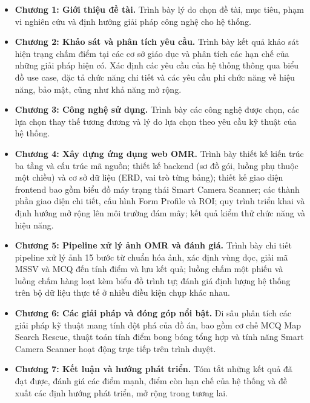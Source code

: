 \begin{itemize}
    \item \textbf{Chương 1: Giới thiệu đề tài.} Trình bày lý do chọn đề tài, mục tiêu, phạm vi nghiên cứu và định hướng giải pháp công nghệ cho hệ thống.

    \item \textbf{Chương 2: Khảo sát và phân tích yêu cầu.} Trình bày kết quả khảo sát hiện trạng chấm điểm tại các cơ sở giáo dục và phân tích các hạn chế của những giải pháp hiện có. Xác định các yêu cầu của hệ thống thông qua biểu đồ use case, đặc tả chức năng chi tiết và các yêu cầu phi chức năng về hiệu năng, bảo mật, cũng như khả năng mở rộng.

    \item \textbf{Chương 3: Công nghệ sử dụng.} Trình bày các công nghệ được chọn, các lựa chọn thay thế tương đương và lý do lựa chọn theo yêu cầu kỹ thuật của hệ thống.

    \item \textbf{Chương 4: Xây dựng ứng dụng web OMR.} Trình bày thiết kế kiến trúc ba tầng và cấu trúc mã nguồn; thiết kế backend (sơ đồ gói, luồng phụ thuộc một chiều) và cơ sở dữ liệu (ERD, vai trò từng bảng); thiết kế giao diện frontend bao gồm biểu đồ máy trạng thái Smart Camera Scanner; các thành phần giao diện chi tiết, cấu hình Form Profile và ROI; quy trình triển khai và định hướng mở rộng lên môi trường đám mây; kết quả kiểm thử chức năng và hiệu năng.

    \item \textbf{Chương 5: Pipeline xử lý ảnh OMR và đánh giá.} Trình bày chi tiết pipeline xử lý ảnh 15 bước từ chuẩn hóa ảnh, xác định vùng đọc, giải mã MSSV và MCQ đến tính điểm và lưu kết quả; luồng chấm một phiếu và luồng chấm hàng loạt kèm biểu đồ trình tự; đánh giá định lượng hệ thống trên bộ dữ liệu thực tế ở nhiều điều kiện chụp khác nhau.

    \item \textbf{Chương 6: Các giải pháp và đóng góp nổi bật.} Đi sâu phân tích các giải pháp kỹ thuật mang tính đột phá của đồ án, bao gồm cơ chế MCQ Map Search Rescue, thuật toán tính điểm bong bóng tổng hợp và tính năng Smart Camera Scanner hoạt động trực tiếp trên trình duyệt.

    \item \textbf{Chương 7: Kết luận và hướng phát triển.} Tóm tắt những kết quả đã đạt được, đánh giá các điểm mạnh, điểm còn hạn chế của hệ thống và đề xuất các định hướng phát triển, mở rộng trong tương lai.
\end{itemize}
